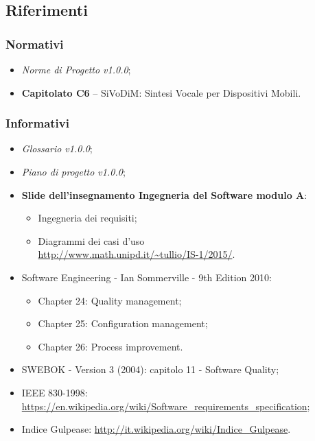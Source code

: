 \subsection{Riferimenti}

\subsubsection{Normativi}
\begin{itemize}
\item \textit{Norme di Progetto v1.0.0};
\item \textbf{Capitolato C6} – SiVoDiM: Sintesi Vocale per Dispositivi Mobili.
\end{itemize}

\subsubsection{Informativi}
\begin{itemize}
\item \textit{Glossario v1.0.0};
\item \textit{Piano di progetto v1.0.0};
\item \textbf{Slide dell’insegnamento Ingegneria del Software modulo A}:
\begin{itemize}
\item Ingegneria dei requisiti;
\item Diagrammi dei casi d'uso\\
\url{http://www.math.unipd.it/~tullio/IS-1/2015/}.
\end{itemize}
\item Software Engineering - Ian Sommerville - 9th Edition 2010:
\begin{itemize}
\item Chapter 24: Quality management;
\item Chapter 25: Configuration management;
\item Chapter 26: Process improvement.
\end{itemize} 
\item SWEBOK - Version 3 (2004): capitolo 11 - Software Quality;
\item IEEE 830-1998: \url{ 
https://en.wikipedia.org/wiki/Software_requirements_specification};
\item Indice Gulpease: \url{http://it.wikipedia.org/wiki/Indice_Gulpease}.
\end{itemize}
\newpage
